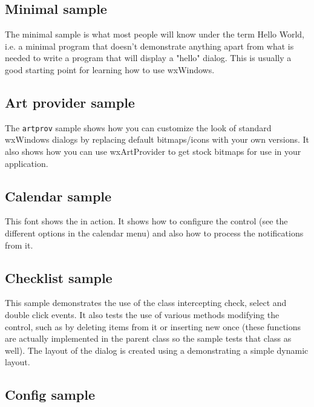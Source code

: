 \subsection{Minimal sample}\label{sampleminimal}

The minimal sample is what most people will know under the term Hello World,
i.e. a minimal program that doesn't demonstrate anything apart from what is
needed to write a program that will display a "hello" dialog. This is usually
a good starting point for learning how to use wxWindows.

\subsection{Art provider sample}\label{sampleartprovider}

The {\tt artprov} sample shows how you can customize the look of standard
wxWindows dialogs by replacing default bitmaps/icons with your own versions.
It also shows how you can use wxArtProvider to
get stock bitmaps for use in your application.

\subsection{Calendar sample}\label{samplecalendar}

This font shows the  in action. It
shows how to configure the control (see the different options in the calendar
menu) and also how to process the notifications from it.

\subsection{Checklist sample}\label{samplechecklist}

This sample demonstrates the use of the 
class intercepting check, select and double click events. It also tests the
use of various methods modifying the control, such as by deleting items
from it or inserting new once (these functions are actually implemented in
the parent class  so the sample tests that class
as well). The layout of the dialog is created using a 
demonstrating a simple dynamic layout.

\subsection{Config sample}\label{sampleconfig}

